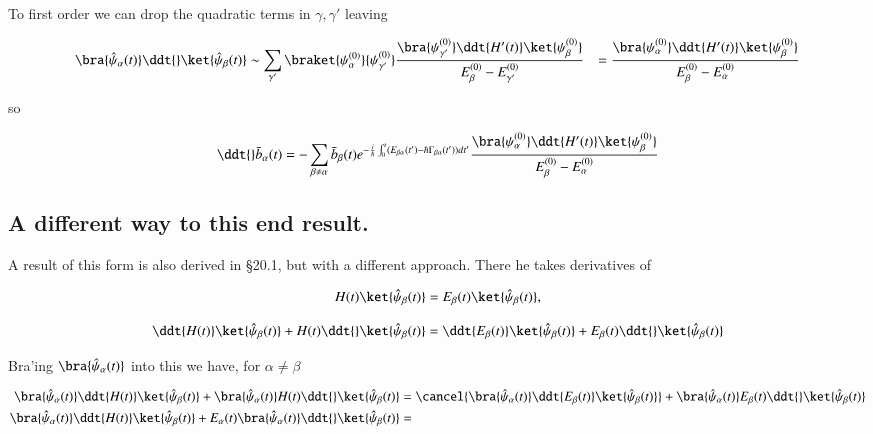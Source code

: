 To first order we can drop the quadratic terms in $\gamma,\gamma'$ leaving

\begin{equation}\label{eqn:qmTwoR3:530}
\begin{aligned}
\bra{\hat{\psi}_\alpha(t)}
\ddt{} \ket{\hat{\psi}_\beta(t)}
&\sim
\sum_{\gamma'} 
\braket{\psi_{\alpha}^{(0)}}{\psi_{\gamma'}^{(0)}} 
\frac{ 
\bra{\psi_{\gamma'}^{(0)}} \ddt{H'(t)} \ket{\psi_\beta^{(0)}} 
}{
E_\beta^{(0)} 
-E_{\gamma'}^{(0)} 
}
&=
\frac{ 
\bra{\psi_{\alpha}^{(0)}} \ddt{H'(t)} \ket{\psi_\beta^{(0)}} 
}{
E_\beta^{(0)} 
-E_{\alpha}^{(0)} 
}
\end{aligned}
\end{equation}

so

\begin{equation}\label{eqn:qmTwoR3:550}
\ddt{}\bar{b}_\alpha(t)
=
-\sum_{\beta \ne \alpha} \bar{b}_\beta(t)
e^{-\frac{i}{\hbar} \int_0^t (E_{\beta\alpha}(t') - \hbar \Gamma_{\beta\alpha}(t')) dt'}
\frac{ 
\bra{\psi_{\alpha}^{(0)}} \ddt{H'(t)} \ket{\psi_\beta^{(0)}} 
}{
E_\beta^{(0)} 
-E_{\alpha}^{(0)} 
}
\end{equation}

\subsection{A different way to this end result.}

A result of this form is also derived in \cite{bohm1989qt} \S 20.1, but with a different approach.  There he takes derivatives of

\begin{equation}\label{eqn:qmTwoR3:610}
H(t) \ket{\hat{\psi}_\beta(t)} = E_\beta(t) \ket{\hat{\psi}_\beta(t)},
\end{equation}

\begin{equation}\label{eqn:qmTwoR3:630}
\ddt{H(t)} \ket{\hat{\psi}_\beta(t)} + H(t) \ddt{}\ket{\hat{\psi}_\beta(t)} = \ddt{E_\beta(t)} \ket{\hat{\psi}_\beta(t)}
+ E_\beta(t) \ddt{} \ket{\hat{\psi}_\beta(t)}
\end{equation}

Bra'ing $\bra{\hat{\psi}_\alpha(t)}$ into this we have, for $\alpha \ne \beta$

\begin{align*}
\bra{\hat{\psi}_\alpha(t)}
\ddt{H(t)} \ket{\hat{\psi}_\beta(t)} 
+ 
\bra{\hat{\psi}_\alpha(t)}
H(t) \ddt{}\ket{\hat{\psi}_\beta(t)} 
&= 
\cancel{
\bra{\hat{\psi}_\alpha(t)}
\ddt{E_\beta(t)} \ket{\hat{\psi}_\beta(t)}
}
+ 
\bra{\hat{\psi}_\alpha(t)}
E_\beta(t) \ddt{} \ket{\hat{\psi}_\beta(t)}
 \\
\bra{\hat{\psi}_\alpha(t)}
\ddt{H(t)} \ket{\hat{\psi}_\beta(t)} 
+ 
E_\alpha(t) \bra{\hat{\psi}_\alpha(t)}
\ddt{}\ket{\hat{\psi}_\beta(t)} 
&=
\end{align*}

